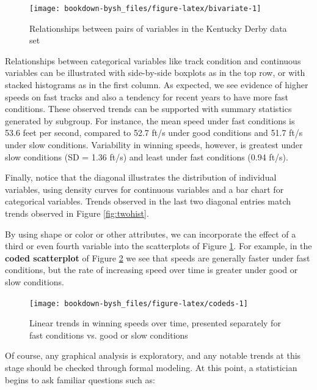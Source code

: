 \documentclass[
]{krantz}
\begin{document}
\begin{figure}

{\centering \texttt{[image: bookdown-bysh\_files/figure-latex/bivariate-1]} 

}

\caption{Relationships between pairs of variables in the Kentucky Derby data set}\label{fig:bivariate}
\end{figure}

Relationships between categorical variables like track condition and continuous variables can be illustrated with side-by-side boxplots as in the top row, or with stacked histograms as in the first column. As expected, we see evidence of higher speeds on fast tracks and also a tendency for recent years to have more fast conditions. These observed trends can be supported with summary statistics generated by subgroup. For instance, the mean speed under fast conditions is 53.6 feet per second, compared to 52.7 ft/s under good conditions and 51.7 ft/s under slow conditions. Variability in winning speeds, however, is greatest under slow conditions (SD = 1.36 ft/s) and least under fast conditions (0.94 ft/s).

Finally, notice that the diagonal illustrates the distribution of individual variables, using density curves for continuous variables and a bar chart for categorical variables. Trends observed in the last two diagonal entries match trends observed in Figure \ref{fig:twohist}.

By using shape or color or other attributes, we can incorporate the effect of a third or even fourth variable into the scatterplots of Figure \ref{fig:bivariate}. For example, in the \textbf{coded scatterplot} of Figure \ref{fig:codeds} we see that speeds are generally faster under fast conditions, but the rate of increasing speed over time is greater under good or slow conditions.

\begin{figure}

{\centering \texttt{[image: bookdown-bysh\_files/figure-latex/codeds-1]} 

}

\caption{Linear trends in winning speeds over time, presented separately for fast conditions vs. good or slow conditions}\label{fig:codeds}
\end{figure}

Of course, any graphical analysis is exploratory, and any notable trends at this stage should be checked through formal modeling. At this point, a statistician begins to ask familiar questions such as:
\end{document}
